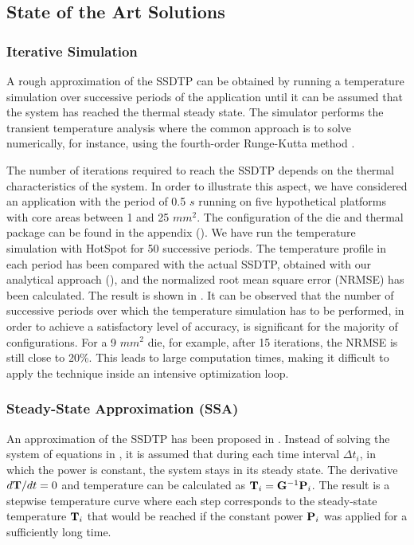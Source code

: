 \subsection{State of the Art Solutions} 

\subsubsection{Iterative Simulation} 

A rough approximation of the SSDTP can be obtained by running a temperature
simulation over successive periods of the application until it can be assumed
that the system has reached the thermal steady state. The simulator performs the
transient temperature analysis where the common approach is to solve
 numerically, for instance, using the fourth-order
Runge-Kutta method \cite{press2007}.

The number of iterations required to reach the SSDTP depends on the thermal
characteristics of the system. In order to illustrate this aspect, we have
considered an application with the period of 0.5 $s$ running on five
hypothetical platforms with core areas between 1 and 25 $mm^2$. The
configuration of the die and thermal package can be found in the appendix
(). We have run the temperature simulation with HotSpot
\cite{huang2003} for 50 successive periods. The temperature profile in each
period has been compared with the actual SSDTP, obtained with our analytical
approach (), and the normalized root mean square error
(NRMSE) has been calculated. The result is shown in . It can
be observed that the number of successive periods over which the temperature
simulation has to be performed, in order to achieve a satisfactory level of
accuracy, is significant for the majority of configurations. For a 9 $mm^2$ die,
for example, after 15 iterations, the NRMSE is still close to 20\%. This leads
to large computation times, making it difficult to apply the technique inside an
intensive optimization loop.

\subsubsection{Steady-State Approximation (SSA)} 

An approximation of the SSDTP has been proposed in \cite{huang2009}. Instead of
solving the system of equations in , it is assumed that
during each time interval $\Delta t_i$, in which the power is constant, the
system stays in its steady state. The derivative $d\mathbf{T}/dt = 0$ and temperature
can be calculated as $\mathbf{T}_i = \mathbf{G}^{-1} \mathbf{P}_i$. The result is a stepwise
temperature curve where each step corresponds to the steady-state temperature
$\mathbf{T}_i$ that would be reached if the constant power $\mathbf{P}_i$ was applied for
a sufficiently long time.


